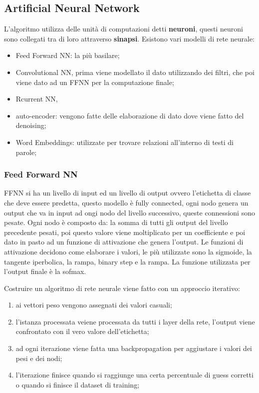 \documentclass[12pt]{article}
\begin{document}
\subsection{Artificial Neural Network}
L'algoritmo utilizza delle unit\`a di computazioni detti \textbf{neuroni}, questi neuroni sono collegati tra di loro attraverso \textbf{sinapsi}. Esistono vari modelli di rete neurale:
\begin{itemize}
    \item Feed Forward NN: la pi\`u basilare;
    \item Convolutional NN, prima viene modellato il dato utilizzando dei filtri, che poi viene dato ad un FFNN per la computazione finale;
    \item Rcurrent NN, 
    \item auto-encoder: vengono fatte delle elaborazione di dato dove viene fatto del denoising;
    \item Word Embeddings: utilizzate per trovare relazioni all'interno di testi di parole;
\end{itemize}

\subsubsection{Feed Forward NN}
FFNN si ha un livello di input ed un livello di output ovvero l'etichetta di classe che deve essere predetta, questo modello \`e fully connected, ogni nodo genera un output che va in input ad ongi nodo del livello successivo, queste connessioni sono pesate. Ogni nodo \`e composto da: la somma di tutti gli output del livello precedente pesati, poi questo valore viene moltiplicato per un coefficiente e poi dato in pasto ad un funzione di attivazione che genera l'output. Le funzioni di attivazione decidono come elaborare i valori, le pi\`u utilizzate sono la sigmoide, la tangente iperbolica, la rampa, binary step e la rampa. La funzione utilizzata per l'output finale \`e la sofmax. 

Costruire un algoritmo di rete neurale viene fatto con un approccio iterativo:
\begin{enumerate}
    \item ai vettori peso vengono assegnati dei valori casuali;
    \item l'istanza processata veiene processata da tutti i layer della rete, l'output viene confrontato con il vero valore dell'etichetta;
    \item ad ogni iterazione viene fatta una backpropagation per aggiustare i valori dei pesi e dei nodi;
    \item l'iterazione finisce quando si raggiunge una certa percentuale di guess corretti o quando si finisce il dataset di training;
\end{enumerate}
\end{document}
